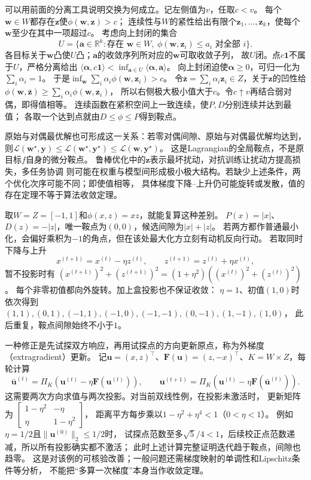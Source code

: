 可以用前面的分离工具说明交换为何成立。记左侧值为$v$，任取$c<v$。
每个$\bm w\in W$都存在$\bm z$使$\phi(\bm w,\bm z)>c$；
连续性与$W$的紧性给出有限个$\bm z_1,\ldots,\bm z_k$，使每个$\bm w$至少在其中一项超过$c$。
考虑向上封闭的集合
\[
 U=\{\bm a\in\mathbb R^k:\text{存在 }\bm w\in W,\
          \phi(\bm w,\bm z_i)\leq a_i\text{ 对全部 }i\}.
\]
各目标关于$\bm w$凸使$U$凸；$\bm a$的收敛序列所对应的$\bm w$可取收敛子列，
故$U$闭。点$c\bm1$不属于$U$，严格分离给出
$\langle\bm\alpha,c\bm1\rangle<
\inf_{\bm a\in U}\langle\bm\alpha,\bm a\rangle$。
向上封闭迫使$\bm\alpha\geq0$，可归一化为$\sum_i\alpha_i=1$。
于是$\inf_{\bm w}\sum_i\alpha_i\phi(\bm w,\bm z_i)>c$。
令$\bar{\bm z}=\sum_i\alpha_i\bm z_i\in Z$，关于$\bm z$的凹性给
$\phi(\bm w,\bar{\bm z})\geq\sum_i\alpha_i\phi(\bm w,\bm z_i)$，
所以右侧极大极小值大于$c$。令$c\uparrow v$再结合弱对偶，即得值相等。
连续函数在紧积空间上一致连续，使$P,D$分别连续并达到最值；
各取一个达到点就由$D\leq\phi\leq P$得到鞍点。

原始与对偶最优解也可形成这一关系：若零对偶间隙、原始与对偶最优解均达到，
则$\mathcal L(\bm w^\star,\bm y)\leq
\mathcal L(\bm w^\star,\bm y^\star)\leq\mathcal L(\bm w,\bm y^\star)$。
这是Lagrangian的全局鞍点，不是原目标$f$自身的微分鞍点。
鲁棒优化中的$\bm{z}$表示最坏扰动，对抗训练让扰动方提高损失，多任务协调
则可能在权重与模型间形成极小极大结构。若缺少上述条件，两个优化次序可能不同；即使值相等，
具体梯度下降--上升仍可能旋转或发散，值的存在定理不等于算法收敛定理。

取$W=Z=[-1,1]$和$\phi(x,z)=xz$，就能复算这种差别。
$P(x)=|x|$、$D(z)=-|z|$，唯一鞍点为$(0,0)$，候选间隙为$|x|+|z|$。
若两方都作普通最小化，会偏好乘积为$-1$的角点，但在该处最大化方立刻有动机反向行动。
若取同时下降与上升
\[
 x^{(t+1)}=x^{(t)}-\eta z^{(t)},\qquad
 z^{(t+1)}=z^{(t)}+\eta x^{(t)},
\]
暂不投影时有
$(x^{(t+1)})^2+(z^{(t+1)})^2=(1+\eta^2)((x^{(t)})^2+(z^{(t)})^2)$。
每个非零初值都向外旋转。加上盒投影也不保证收敛：
$\eta=1$、初值$(1,0)$时依次得到
$(1,1),(0,1),(-1,1),(-1,0),(-1,-1),(0,-1),(1,-1),(1,0)$，
此后重复，鞍点间隙始终不小于$1$。

一种修正是先试探双方响应，再用试探点的方向更新原点，称为外梯度（extragradient）更新。
记$\bm u=(x,z)^\top$、$\bm F(\bm u)=(z,-x)^\top$、$K=W\times Z$，每轮计算
\[
 \bar{\bm u}^{(t)}=\Pi_K(\bm u^{(t)}-\eta\bm F(\bm u^{(t)})),\qquad
 \bm u^{(t+1)}=\Pi_K(\bm u^{(t)}-\eta\bm F(\bar{\bm u}^{(t)})).
\]
这需要两次方向求值与两次投影。对当前双线性例，在投影未激活时，
更新矩阵为
$\left[\begin{smallmatrix}1-\eta^2&-\eta\\ \eta&1-\eta^2\end{smallmatrix}\right]$，
距离平方每步乘以$1-\eta^2+\eta^4<1$（$0<\eta<1$）。
例如$\eta=1/2$且$\|\bm u^{(0)}\|_2\leq1/2$时，
试探点范数至多$\sqrt{5}/4<1$，后续校正点范数递减，所以所有投影确实都不激活；
此时上述计算完整证明迭代趋于鞍点，间隙也趋零。
这是对该例的可核验改善；一般问题还需梯度映射的单调性和Lipschitz条件等分析，
不能把“多算一次梯度”本身当作收敛定理。

